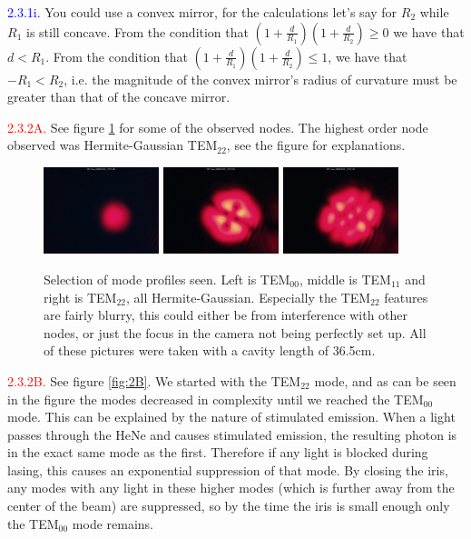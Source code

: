 \documentclass[letterpaper, reqno,11pt]{article}
\begin{document}
\noindent \textcolor{blue}{2.3.1i.} You could use a convex mirror, for the calculations let's say for $R_2$ while $R_1$ is still concave. From the condition that $\left(1+ \frac{d}{R_1}\right) \left( 1+ \frac{d}{R_2} \right)\geq 0$ we have that $d<R_1$. From the condition that $\left(1+ \frac{d}{R_1}\right) \left( 1+ \frac{d}{R_2} \right)\leq 1$, we have that $-R_1<R_2$, i.e. the magnitude of the convex mirror's radius of curvature must be greater than that of the concave mirror.

\noindent \textcolor{red}{2.3.2A.} See figure \ref{fig:2A} for some of the observed nodes. The highest order node observed was Hermite-Gaussian TEM$_{22}$, see the figure for explanations.

\begin{figure}[tb]
    \centering
    \includegraphics[width=0.3\textwidth]{data/2A/im_0228_20240301_175138.jpg}
    \includegraphics[width=0.3\textwidth]{data/2A/im_0224_20240301_175122.jpg}
    \includegraphics[width=0.3\textwidth]{data/2A/im_0223_20240301_175118.jpg}
    \caption{Selection of mode profiles seen. Left is TEM$_{00}$, middle is TEM$_{11}$ and right is TEM$_{22}$, all Hermite-Gaussian. Especially the TEM$_{22}$ features are fairly blurry, this could either be from interference with other nodes, or just the focus in the camera not being perfectly set up. All of these pictures were taken with a cavity length of 36.5cm.}
    \label{fig:2A}
\end{figure}

\noindent \textcolor{red}{2.3.2B.} See figure \ref{fig:2B}. We started with the TEM$_{22}$ mode, and as can be seen in the figure the modes decreased in complexity until we reached the TEM$_{00}$ mode. This can be explained by the nature of stimulated emission. When a light passes through the HeNe and causes stimulated emission, the resulting photon is in the exact same mode as the first. Therefore if any light is blocked during lasing, this causes an exponential suppression of that mode. By closing the iris, any modes with any light in these higher modes (which is further away from the center of the beam) are suppressed, so by the time the iris is small enough only the TEM$_{00}$ mode remains.
\end{document}
